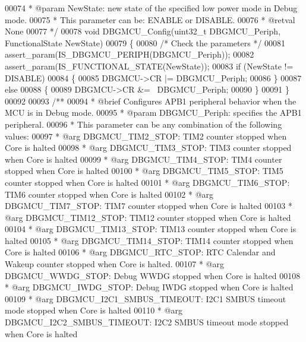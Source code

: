 \begin{DoxyCode}
00074 \textcolor{comment}{  * @param  NewState: new state of the specified low power mode in Debug mode.}
00075 \textcolor{comment}{  *   This parameter can be: ENABLE or DISABLE.}
00076 \textcolor{comment}{  * @retval None}
00077 \textcolor{comment}{  */}
00078 \textcolor{keywordtype}{void} DBGMCU_Config(uint32\_t DBGMCU\_Periph, FunctionalState NewState)
00079 \{
00080   \textcolor{comment}{/* Check the parameters */}
00081   assert_param(IS\_DBGMCU\_PERIPH(DBGMCU\_Periph));
00082   assert_param(IS\_FUNCTIONAL\_STATE(NewState));
00083   \textcolor{keywordflow}{if} (NewState != DISABLE)
00084   \{
00085     DBGMCU->CR |= DBGMCU\_Periph;
00086   \}
00087   \textcolor{keywordflow}{else}
00088   \{
00089     DBGMCU->CR &= ~DBGMCU\_Periph;
00090   \}
00091 \}
00092 
00093 \textcolor{comment}{/**}
00094 \textcolor{comment}{  * @brief  Configures APB1 peripheral behavior when the MCU is in Debug mode.}
00095 \textcolor{comment}{  * @param  DBGMCU\_Periph: specifies the APB1 peripheral.}
00096 \textcolor{comment}{  *   This parameter can be any combination of the following values:        }
00097 \textcolor{comment}{  *     @arg DBGMCU\_TIM2\_STOP: TIM2 counter stopped when Core is halted          }
00098 \textcolor{comment}{  *     @arg DBGMCU\_TIM3\_STOP: TIM3 counter stopped when Core is halted          }
00099 \textcolor{comment}{  *     @arg DBGMCU\_TIM4\_STOP: TIM4 counter stopped when Core is halted}
00100 \textcolor{comment}{  *     @arg DBGMCU\_TIM5\_STOP: TIM5 counter stopped when Core is halted          }
00101 \textcolor{comment}{  *     @arg DBGMCU\_TIM6\_STOP: TIM6 counter stopped when Core is halted          }
00102 \textcolor{comment}{  *     @arg DBGMCU\_TIM7\_STOP: TIM7 counter stopped when Core is halted}
00103 \textcolor{comment}{  *     @arg DBGMCU\_TIM12\_STOP: TIM12 counter stopped when Core is halted  }
00104 \textcolor{comment}{  *     @arg DBGMCU\_TIM13\_STOP: TIM13 counter stopped when Core is halted  }
00105 \textcolor{comment}{  *     @arg DBGMCU\_TIM14\_STOP: TIM14 counter stopped when Core is halted }
00106 \textcolor{comment}{  *     @arg DBGMCU\_RTC\_STOP: RTC Calendar and Wakeup counter stopped when Core is halted.            
                                                                          }
00107 \textcolor{comment}{  *     @arg DBGMCU\_WWDG\_STOP: Debug WWDG stopped when Core is halted}
00108 \textcolor{comment}{  *     @arg DBGMCU\_IWDG\_STOP: Debug IWDG stopped when Core is halted        }
00109 \textcolor{comment}{  *     @arg DBGMCU\_I2C1\_SMBUS\_TIMEOUT: I2C1 SMBUS timeout mode stopped when Core is halted}
00110 \textcolor{comment}{  *     @arg DBGMCU\_I2C2\_SMBUS\_TIMEOUT: I2C2 SMBUS timeout mode stopped when Core is halted}

\end{DoxyCode}
